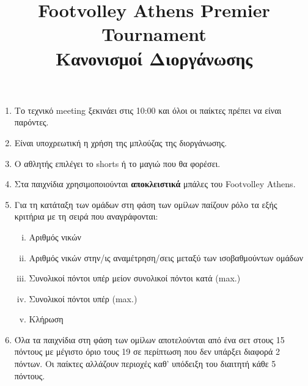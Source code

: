 \documentclass[a4paper,11pt]{article}
\title{Footvolley Athens Premier Tournament \\ Κανονισμοί Διοργάνωσης}
\date{}
\begin{document}
\maketitle
\thispagestyle{fancy}

\vspace{-3cm}

\begin{enumerate}

\item Το τεχνικό meeting ξεκινάει στις 10:00 και όλοι οι παίκτες πρέπει να είναι
  παρόντες.

\item Είναι υποχρεωτική η χρήση της μπλούζας της διοργάνωσης.

\item Ο αθλητής επιλέγει το shorts ή το μαγιώ που θα φορέσει.

\item Στα παιχνίδια χρησιμοποιούνται \textbf{αποκλειστικά} μπάλες του Footvolley
  Athens.




\item Για τη κατάταξη των ομάδων στη φάση των ομίλων παίζουν ρόλο τα εξής
  κριτήρια με τη σειρά που αναγράφονται:

  \begin{enumerate}[i)]
  \item Αριθμός νικών
  \item Αριθμός νικών στην/ις αναμέτρηση/σεις μεταξύ των ισοβαθμούντων ομάδων
  \item Συνολικοί πόντοι υπέρ μείον συνολικοί πόντοι κατά (max.)
  \item Συνολικοί πόντοι υπέρ (max.)
  \item Κλήρωση %
  \end{enumerate}

\item Όλα τα παιχνίδια στη φάση των ομίλων αποτελούνται από ένα σετ στους 15
  πόντους με μέγιστο όριο τους 19 σε περίπτωση που δεν υπάρξει διαφορά 2 πόντων.
  Οι παίκτες αλλάζουν περιοχές καθ' υπόδειξη του διαιτητή κάθε 5 πόντους.


\end{enumerate}
\end{document}
